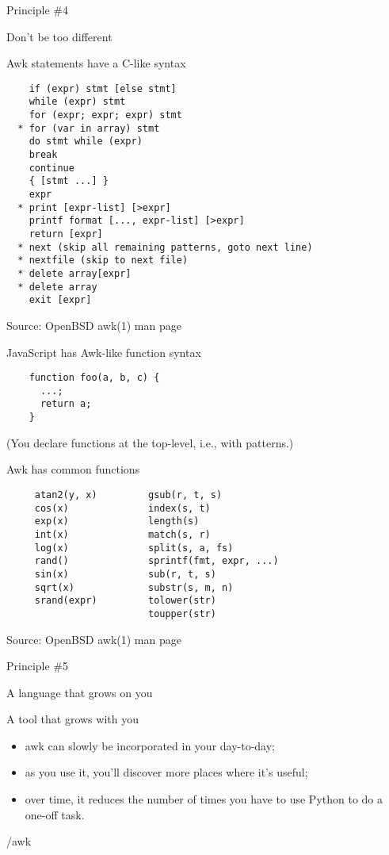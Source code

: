 \documentclass{beamer}
\renewcommand\big[1]{
  \begin{center}
    \Large{#1}
  \end{center}
}
\begin{document}
\begin{frame}
  \centering\Huge{Principle \#4}
  \big{Don't be too different}
\end{frame}

\begin{frame}[fragile]
  \big{Awk statements have a C-like syntax}

  \begin{lstlisting}
    if (expr) stmt [else stmt]
    while (expr) stmt
    for (expr; expr; expr) stmt
  * for (var in array) stmt
    do stmt while (expr)
    break
    continue
    { [stmt ...] }
    expr
  * print [expr-list] [>expr]
    printf format [..., expr-list] [>expr]
    return [expr]
  * next (skip all remaining patterns, goto next line)
  * nextfile (skip to next file)
  * delete array[expr]
  * delete array
    exit [expr]
  \end{lstlisting}
  \scriptsize{Source: OpenBSD awk(1) man page}
\end{frame}

\begin{frame}[fragile]
  \big{JavaScript has Awk-like function syntax}

  \begin{lstlisting}
    function foo(a, b, c) {
      ...;
      return a;
    }
  \end{lstlisting}

  \scriptsize{(You declare functions at the top-level, i.e., with patterns.)}
\end{frame}

\begin{frame}[fragile]
  \big{Awk has common functions}
  \begin{lstlisting}
     atan2(y, x)         gsub(r, t, s)
     cos(x)              index(s, t)
     exp(x)              length(s)
     int(x)              match(s, r)
     log(x)              split(s, a, fs)
     rand()              sprintf(fmt, expr, ...)
     sin(x)              sub(r, t, s)
     sqrt(x)             substr(s, m, n)
     srand(expr)         tolower(str)
                         toupper(str)
  \end{lstlisting}

  \scriptsize{Source: OpenBSD awk(1) man page}
\end{frame}

\begin{frame}
  \centering\Huge{Principle \#5}
  \big{A language that grows on you}
\end{frame}

\begin{frame}
  \big{A tool that grows with you}

  \begin{itemize}
    \item awk can slowly be incorporated in your day-to-day;
    \item as you use it, you'll discover more places where it's useful;
    \item over time, it reduces the number of times you have to use Python to do a one-off task.
  \end{itemize}
\end{frame}

\begin{frame}
  \centering\Huge{/awk}
\end{frame}
\end{document}
